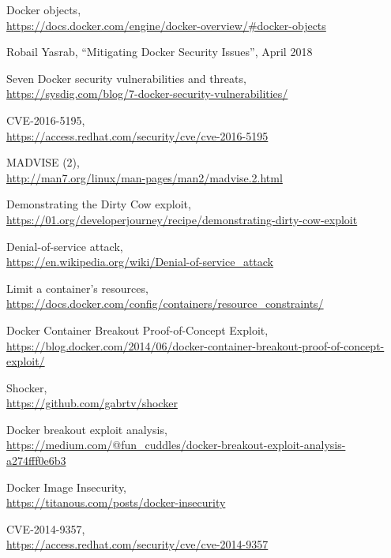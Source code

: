 \documentclass[a4paper,12pt]{article}
\begin{document}
\begin{thebibliography}{99}
Docker objects,\\ \url{https://docs.docker.com/engine/docker-overview/#docker-objects}

Robail Yasrab,
``Mitigating Docker Security Issues'',
April 2018

Seven Docker security vulnerabilities and threats,\\ \url{https://sysdig.com/blog/7-docker-security-vulnerabilities/}

CVE-2016-5195,\\ \url{https://access.redhat.com/security/cve/cve-2016-5195} 

MADVISE (2), \\ \url{http://man7.org/linux/man-pages/man2/madvise.2.html}

Demonstrating the Dirty Cow exploit, \\ \url{https://01.org/developerjourney/recipe/demonstrating-dirty-cow-exploit}

Denial-of-service attack, \\
\url{https://en.wikipedia.org/wiki/Denial-of-service_attack}

Limit a container's resources, \\ \url{https://docs.docker.com/config/containers/resource_constraints/}

Docker Container Breakout Proof-of-Concept Exploit, \\ \url{https://blog.docker.com/2014/06/docker-container-breakout-proof-of-concept-exploit/}

Shocker, \\ \url{https://github.com/gabrtv/shocker}

Docker breakout exploit analysis, \\ \url{https://medium.com/@fun_cuddles/docker-breakout-exploit-analysis-a274fff0e6b3}

Docker Image Insecurity, \\ \url{https://titanous.com/posts/docker-insecurity}

CVE-2014-9357, \\ \url{https://access.redhat.com/security/cve/cve-2014-9357}


\end{thebibliography}
\end{document}

